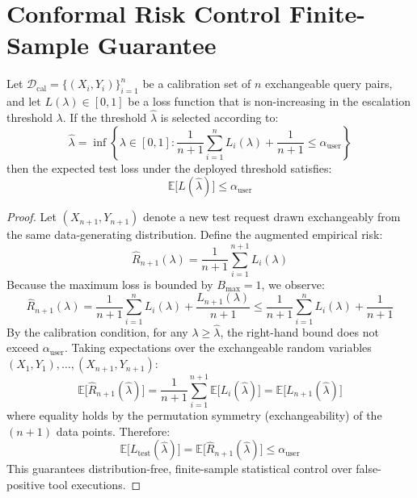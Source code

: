 \section{Conformal Risk Control Finite-Sample Guarantee}
\label{app:proof_conformal}

\begin{theorem}
Let $\mathcal{D}_{\mathrm{cal}} = \{(X_i, Y_i)\}_{i=1}^n$ be a calibration set of $n$ exchangeable query pairs, and let $L(\lambda) \in [0, 1]$ be a loss function that is non-increasing in the escalation threshold $\lambda$. If the threshold $\hat{\lambda}$ is selected according to:
\begin{equation}
    \hat{\lambda} = \inf\left\{ \lambda \in [0, 1] : \frac{1}{n+1}\sum_{i=1}^n L_i(\lambda) + \frac{1}{n+1} \le \alpha_{\mathrm{user}} \right\}
\end{equation}
then the expected test loss under the deployed threshold satisfies:
\begin{equation}
    \mathbb{E}\big[L(\hat{\lambda})\big] \le \alpha_{\mathrm{user}}
\end{equation}
\end{theorem}

\begin{proof}
Let $(X_{n+1}, Y_{n+1})$ denote a new test request drawn exchangeably from the same data-generating distribution. Define the augmented empirical risk:
\begin{equation}
    \hat{R}_{n+1}(\lambda) = \frac{1}{n+1} \sum_{i=1}^{n+1} L_i(\lambda)
\end{equation}
Because the maximum loss is bounded by $B_{\max} = 1$, we observe:
\begin{equation}
    \hat{R}_{n+1}(\lambda) = \frac{1}{n+1}\sum_{i=1}^n L_i(\lambda) + \frac{L_{n+1}(\lambda)}{n+1} \le \frac{1}{n+1}\sum_{i=1}^n L_i(\lambda) + \frac{1}{n+1}
\end{equation}
By the calibration condition, for any $\lambda \ge \hat{\lambda}$, the right-hand bound does not exceed $\alpha_{\mathrm{user}}$.
Taking expectations over the exchangeable random variables $(X_1, Y_1), \dots, (X_{n+1}, Y_{n+1})$:
\begin{equation}
    \mathbb{E}\big[\hat{R}_{n+1}(\hat{\lambda})\big] = \frac{1}{n+1}\sum_{i=1}^{n+1}\mathbb{E}\big[L_i(\hat{\lambda})\big] = \mathbb{E}\big[L_{n+1}(\hat{\lambda})\big]
\end{equation}
where equality holds by the permutation symmetry (exchangeability) of the $(n+1)$ data points. Therefore:
\begin{equation}
    \mathbb{E}\big[L_{\mathrm{test}}(\hat{\lambda})\big] = \mathbb{E}\big[\hat{R}_{n+1}(\hat{\lambda})\big] \le \alpha_{\mathrm{user}}
\end{equation}
This guarantees distribution-free, finite-sample statistical control over false-positive tool executions.
\end{proof}

